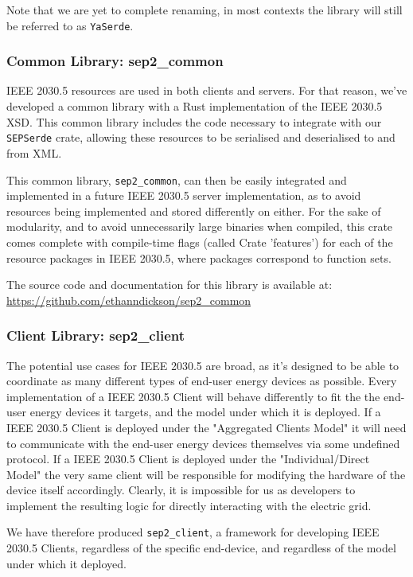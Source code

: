 Note that we are yet to complete renaming, in most contexts the library will still be referred to as \texttt{YaSerde}.

\subsubsection{Common Library: \- sep2\_common}
IEEE 2030.5 resources are used in both clients and servers. For that reason, we've developed a common library with a Rust implementation of the IEEE 2030.5 XSD. This common library includes the code necessary to integrate with our \texttt{SEPSerde} crate, allowing these resources to be serialised and deserialised to and from XML.

This common library, \texttt{sep2\_common}, can then be easily integrated and implemented in a future IEEE 2030.5 server implementation, as to avoid resources being implemented and stored differently on either. 
For the sake of modularity, and to avoid unnecessarily large binaries when compiled, this crate comes complete with compile-time flags (called Crate 'features') for each of the resource packages in IEEE 2030.5, where packages correspond to function sets.

The source code and documentation for this library is available at: \url{https://github.com/ethanndickson/sep2_common}

\subsubsection{Client Library: \- sep2\_client}
The potential use cases for IEEE 2030.5 are broad, as it's designed to be able to coordinate as many different types of end-user energy devices as possible.
Every implementation of a IEEE 2030.5 Client will behave differently to fit the the end-user energy devices it targets, and the model under which it is deployed. 
If a IEEE 2030.5 Client is deployed under the "Aggregated Clients Model" it will need to communicate with the end-user energy devices themselves via some undefined protocol.
If a IEEE 2030.5 Client is deployed under the "Individual/Direct Model" the very same client will be responsible for modifying the hardware of the device itself accordingly. 
Clearly, it is impossible for us as developers to implement the resulting logic for directly interacting with the electric grid.

We have therefore produced \texttt{sep2\_client}, a framework for developing IEEE 2030.5 Clients, regardless of the specific end-device, and regardless of the model under which it deployed.

